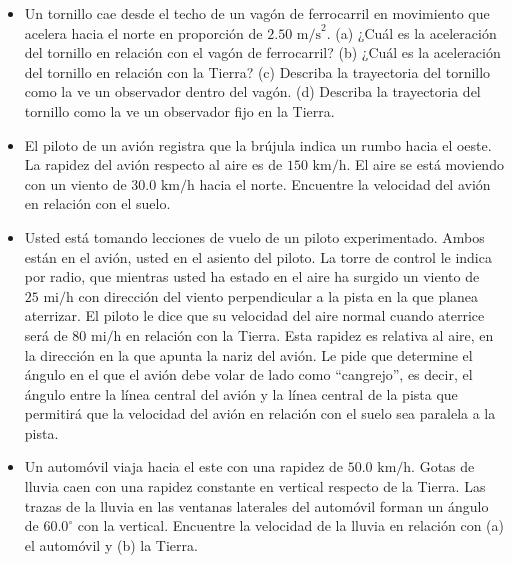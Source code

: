 \documentclass[11pt,a4paper]{article}
\begin{document}
\begin{itemize}
    \item[\textbf{25.}] Un tornillo cae desde el techo de un vagón de ferrocarril en movimiento que acelera hacia el norte en proporción de $2.50 \text{ m/s}^2$. (a) ¿Cuál es la aceleración del tornillo en relación con el vagón de ferrocarril? (b) ¿Cuál es la aceleración del tornillo en relación con la Tierra? (c) Describa la trayectoria del tornillo como la ve un observador dentro del vagón. (d) Describa la trayectoria del tornillo como la ve un observador fijo en la Tierra.
    \vspace*{7cm}

    \item[\textbf{26.}] El piloto de un avión registra que la brújula indica un rumbo hacia el oeste. La rapidez del avión respecto al aire es de $150 \text{ km/h}$. El aire se está moviendo con un viento de $30.0 \text{ km/h}$ hacia el norte. Encuentre la velocidad del avión en relación con el suelo.
    \vspace*{6cm}

    \item[\textbf{27.}] Usted está tomando lecciones de vuelo de un piloto experimentado. Ambos están en el avión, usted en el asiento del piloto. La torre de control le indica por radio, que mientras usted ha estado en el aire ha surgido un viento de $25 \text{ mi/h}$ con dirección del viento perpendicular a la pista en la que planea aterrizar. El piloto le dice que su velocidad del aire normal cuando aterrice será de $80 \text{ mi/h}$ en relación con la Tierra. Esta rapidez es relativa al aire, en la dirección en la que apunta la nariz del avión. Le pide que determine el ángulo en el que el avión debe volar de lado como ``cangrejo'', es decir, el ángulo entre la línea central del avión y la línea central de la pista que permitirá que la velocidad del avión en relación con el suelo sea paralela a la pista.
    \vspace*{6cm}

    \item[\textbf{28.}] Un automóvil viaja hacia el este con una rapidez de $50.0 \text{ km/h}$. Gotas de lluvia caen con una rapidez constante en vertical respecto de la Tierra. Las trazas de la lluvia en las ventanas laterales del automóvil forman un ángulo de $60.0^\circ$ con la vertical. Encuentre la velocidad de la lluvia en relación con (a) el automóvil y (b) la Tierra.
    \vspace*{6cm}
\end{itemize}
\end{document}
